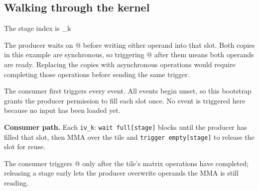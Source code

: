 \subsection*{Walking through the kernel}

The stage index is \co@iv_k %

The producer waits on \co@empty[stage]@ before writing either operand into that slot. Both copies in this example are synchronous, so triggering \co@full[stage]@ after them means both operands are ready. Replacing the copies with asynchronous operations would require completing those operations before sending the same trigger.

The consumer first triggers every \co@empty@ event. All events begin unset, so this bootstrap grants the producer permission to fill each slot once. No \co@full@ event is triggered here because no input has been loaded yet.

\textbf{Consumer path.} Each \texttt{iv\_k}: \texttt{wait full[stage]} blocks until the producer has filled that slot, then MMA over the tile and \texttt{trigger empty[stage]} to release the slot for reuse.

The consumer triggers \co@empty[stage]@ only after the tile's matrix operations have completed; releasing a stage early lets the producer overwrite operands the MMA is still reading.
